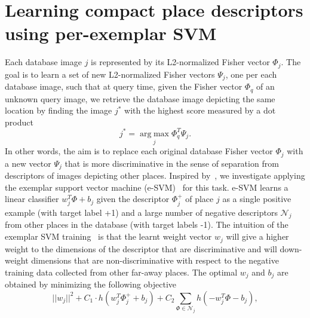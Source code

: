 \documentclass[table]{article} %
\begin{document}
\section{Learning compact place descriptors using per-exemplar SVM}
\label{sec:perExemplar}
	Each database image $j$ is represented by its L2-normalized Fisher vector $\Phi_j$. The goal is to learn a set of new L2-normalized Fisher vectors $\Psi_j$, one per each database image, such that at query time, given the Fisher vector $\Phi_q$ of an unknown query image, we retrieve the database image depicting the same location by finding the image $j^*$ with the highest score measured by a dot product
	\begin{equation}
	    j^*=\operatorname*{arg\;max}_{j} \Phi_q^T \Psi_j. 
	    \label{eq:class}
	\end{equation}
	In other words, the aim is to replace each original database Fisher vector $\Phi_j$ with a new vector $\Psi_j$ that is more discriminative in the sense of separation from descriptors of images depicting other places. 
	Inspired by~\cite{Gronat13}, we investigate applying the exemplar support vector machine (e-SVM)~\cite{Malisiewicz11} for this task. 
	e-SVM learns a linear classifier $w_j^T\Phi+b_j$ given the descriptor $\Phi_j^+$ of place $j$ as a single positive example (with target label +1) and a large number of negative descriptors $\mathcal N_j$ from other places in the database (with target labels -1).
	The intuition of the exemplar SVM training~\cite{Malisiewicz11} is that the learnt weight vector $w_j$ will give a higher weight to the dimensions of the descriptor that are discriminative and will down-weight dimensions that are non-discriminative with respect to the negative training data collected from other far-away places.  The optimal $w_j$ and $b_j$ are obtained	by minimizing the following objective  
        \begin{equation}
	        ||w_j||^{2} +C_1 \cdot h
	        				\left(
	        				w_j^T\Phi^+_j+b_j
	        				\right)
	                         +C_2\sum_{\Phi\in \mathcal N_j}h
	                         \left(
	                         -w_j^T\Phi-b_j
	                         \right), 	
	       	\label{eq:obj} 
	  	\end{equation}
\end{document}
